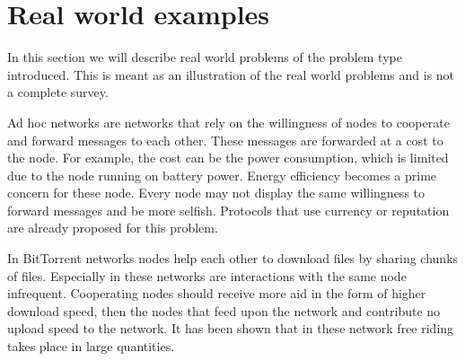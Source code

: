 \section{Real world examples}
In this section we will describe real world problems of the problem type introduced.
This is meant as an illustration of the real world problems and is not a complete survey.

Ad hoc networks are networks that rely on the willingness of nodes to cooperate
and forward messages to each other.
These messages are forwarded at a cost to the node.
For example, the cost can be the power consumption, 
which is limited due to the node running on battery power.
Energy efficiency becomes a prime concern for these node. 
Every node may not display the same willingness to forward messages and be more selfish.
Protocols that use currency or reputation are already proposed
for this problem\cite{Anderegg-AdHoc}.

In BitTorrent networks nodes help each other to download files by sharing chunks of files.
Especially in these networks are interactions with the same node infrequent\cite{Lai-Incentives}.
Cooperating nodes should receive more aid in the form of higher download speed,
then the nodes that feed upon the network and contribute no upload speed to the network.
It has been shown that in these network
free riding takes place in large quantities\cite{Adar-Freeriding}.
